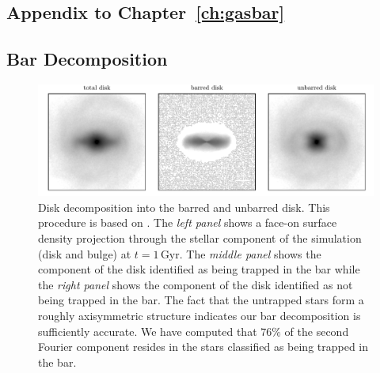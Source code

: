 
\begin{appendices}

\chapter{Appendix to Chapter~\ref{ch:gasbar}}\label{ch:app_gasbar}
\section{Bar Decomposition}
\label{ch2:app:bardecomp}
\begin{figure}
    \centering
    \includegraphics[width=\textwidth]{ch2/fig/bar_decomp.pdf}
    \caption{Disk decomposition into the barred and unbarred disk. This
    procedure is based on \citet{2016MNRAS.463.1952P}. The \textit{left panel}
    shows a face-on surface density projection through the stellar component of
    the \SMUGGLE{} simulation (disk and bulge) at $t=1\,\textrm{Gyr}$. The
    \textit{middle panel} shows the component of the disk identified as being
    trapped in the bar while the \textit{right panel} shows the component of the
    disk identified as not being trapped in the bar. The fact that the untrapped
    stars form a roughly axisymmetric structure indicates our bar decomposition
    is sufficiently accurate. We have computed that $76\%$ of the second Fourier
    component resides in the stars classified as being trapped in the bar.}
    \label{fig:decomp}
\end{figure}


\end{appendices}
